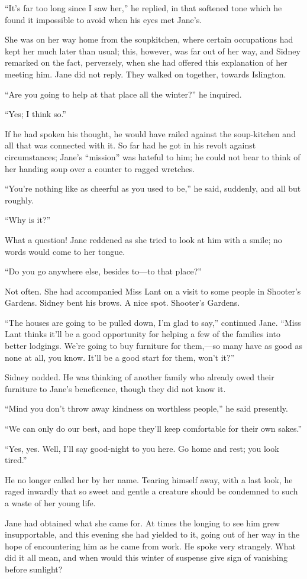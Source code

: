 ``It's far too long since I saw her,'' he replied, in that softened tone
which he found it impossible to avoid when his eyes met Jane's.

She was on her way home from the soupkitchen, where certain occupations
had kept her much later than usual; this, however, was far out of her
way, and Sidney remarked on the fact, perversely, when she had offered
this explanation of her meeting him. Jane did not reply. They walked on
together, towards Islington.

``Are you going to help at that place all the winter?'' he inquired.

{}``Yes; I think so.''

If he had spoken his thought, he would have railed against the
soup-kitchen and all that was connected with it. So far had he got in
his revolt against circumstances; Jane's ``mission'' was hateful to him;
he could not bear to think of her handing soup over a counter to ragged
wretches.

``You're nothing like as cheerful as you used to be,'' he said,
suddenly, and all but roughly.

``Why is it?''

What a question! Jane reddened as she tried to look at him with a smile;
no words would come to her tongue.

``Do you go anywhere else, besides to---to that place?''

Not often. She had accompanied Miss Lant on a visit to some people in
Shooter's Gardens. Sidney bent his brows. A nice spot. Shooter's
Gardens.

``The houses are going to be pulled down, I'm glad to say,'' continued
Jane. ``Miss Lant thinks it'll be a good opportunity for helping a few
of the families into better lodgings. We're going to buy furniture for
them,---so many have as good as none at all, you {}know. It'll be a good
start for them, won't it?''

Sidney nodded. He was thinking of another family who already owed their
furniture to Jane's beneficence, though they did not know it.

``Mind you don't throw away kindness on worthless people,'' he said
presently.

``We can only do our best, and hope they'll keep comfortable for their
own sakes.''

``Yes, yes. Well, I'll say good-night to you here. Go home and rest; you
look tired.''

He no longer called her by her name. Tearing himself away, with a last
look, he raged inwardly that so sweet and gentle a creature should be
condemned to such a waste of her young life.

Jane had obtained what she came for. At times the longing to see him
grew insupportable, and this evening she had yielded to it, going out of
her way in the hope of encountering him as he came from work. He spoke
very strangely. What did it all mean, and when would this winter of
suspense give sign of vanishing before sunlight?
